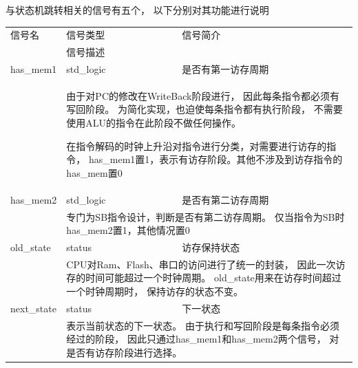             与状态机跳转相关的信号有五个，
            以下分别对其功能进行说明

            \begin{tabularx}{\textwidth}{lll}
                \toprule
                信号名          & 信号类型  & 信号简介 \\
                \cmidrule(l){2-3}
                &
                \multicolumn{2}{X}{信号描述} \\
                \midrule
                has\_mem1             & std\_logic        & 是否有第一访存周期 \\
                \cmidrule(l){2-3}
                &
                \multicolumn{2}{X}{
                    由于对PC的修改在WriteBack阶段进行，
                    因此每条指令都必须有写回阶段。
                    为简化实现，也迫使每条指令都有执行阶段，
                    不需要使用ALU的指令在此阶段不做任何操作。

                    在指令解码的时钟上升沿对指令进行分类，对需要进行访存的指令，
                    has\_mem1置1，表示有访存阶段。其他不涉及到访存指令的has\_mem置0
                } \\
                \midrule
                has\_mem2             & std\_logic        & 是否有第二访存周期 \\
                \cmidrule(l){2-3}
                &
                \multicolumn{2}{X}{
                    专门为SB指令设计，判断是否有第二访存周期。
                    仅当指令为SB时has\_mem2置1，其他情况置0
                } \\
                \midrule
                old\_state             & status        & 访存保持状态 \\
                \cmidrule(l){2-3}
                &
                \multicolumn{2}{X}{
                    CPU对Ram、Flash、串口的访问进行了统一的封装，
                    因此一次访存的时间可能超过一个时钟周期。
                    old\_state用来在访存时间超过一个时钟周期时，
                    保持访存的状态不变。
                } \\
                \midrule
                next\_state             & status        & 下一状态 \\
                \cmidrule(l){2-3}
                &
                \multicolumn{2}{X}{
                    表示当前状态的下一状态。
                    由于执行和写回阶段是每条指令必须经过的阶段，
                    因此只通过has\_mem1和has\_mem2两个信号，
                    对是否有访存阶段进行选择。

}
\end{tabularx}
